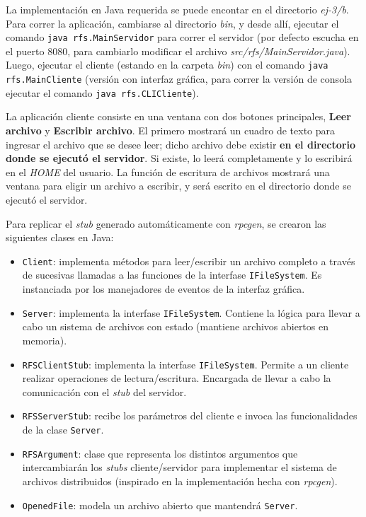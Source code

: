 La implementación en Java requerida se puede encontar en el directorio \emph{ej-3/b}. Para correr la aplicación, cambiarse al directorio \emph{bin}, y desde allí, ejecutar el comando \texttt{java rfs.MainServidor} para correr el servidor (por defecto escucha en el puerto 8080, para cambiarlo modificar el archivo \emph{src/rfs/MainServidor.java}). Luego, ejecutar el cliente (estando en la carpeta \emph{bin}) con el comando \texttt{java rfs.MainCliente} (versión con interfaz gráfica, para correr la versión de consola ejecutar el comando \texttt{java rfs.CLICliente}).

La aplicación cliente consiste en una ventana con dos botones principales, \textbf{Leer archivo} y \textbf{Escribir archivo}. El primero mostrará un cuadro de texto para ingresar el archivo que se desee leer; dicho archivo debe existir \textbf{en el directorio donde se ejecutó el servidor}. Si existe, lo leerá completamente y lo escribirá en el \emph{HOME} del usuario. La función de escritura de archivos mostrará una ventana para eligir un archivo a escribir, y será escrito en el directorio donde se ejecutó el servidor. 

Para replicar el \emph{stub} generado automáticamente con \emph{rpcgen}, se crearon las siguientes clases en Java:
\begin{itemize}
    \item \texttt{Client}: implementa métodos para leer/escribir un archivo completo a través de sucesivas llamadas a las funciones de la interfase \texttt{IFileSystem}. Es instanciada por los manejadores de eventos de la interfaz gráfica.
    \item \texttt{Server}: implementa la interfase \texttt{IFileSystem}. Contiene la lógica para llevar a cabo un sistema de archivos con estado (mantiene archivos abiertos en memoria).
    \item \texttt{RFSClientStub}: implementa la interfase \texttt{IFileSystem}. Permite a un cliente realizar operaciones de lectura/escritura. Encargada de llevar a cabo la comunicación con el \emph{stub} del servidor.
    \item \texttt{RFSServerStub}: recibe los parámetros del cliente e invoca las funcionalidades de la clase \texttt{Server}.
    \item \texttt{RFSArgument}: clase que representa los distintos argumentos que intercambiarán los \emph{stubs} cliente/servidor para implementar el sistema de archivos distribuidos (inspirado en la implementación hecha con \emph{rpcgen}).  
    \item \texttt{OpenedFile}: modela un archivo abierto que mantendrá \texttt{Server}.
\end{itemize}

